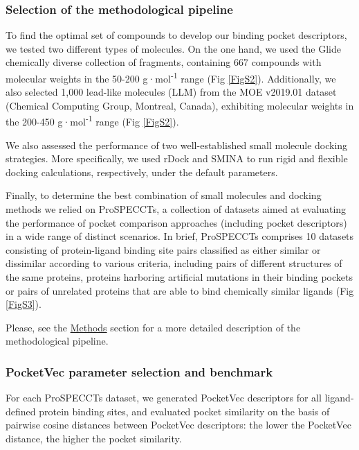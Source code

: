 \subsubsection{Selection of the methodological pipeline}

To find the optimal set of compounds to develop our binding pocket descriptors, we tested two different types of molecules. On the one hand, we used the Glide chemically diverse collection of fragments\cite{friesner_glide_2004, halgren_glide_2004}, containing 667 compounds with molecular weights in the 50-200 g·mol\textsuperscript{-1} range (Fig \ref{FigS2}). Additionally, we also selected 1,000 lead-like molecules (LLM) from the MOE v2019.01 dataset (Chemical Computing Group, Montreal, Canada), exhibiting molecular weights in the 200-450 g·mol\textsuperscript{-1} range (Fig \ref{FigS2}).

We also assessed the performance of two well-established small molecule docking strategies. More specifically, we used rDock\cite{ruiz-carmona_rdock_2014} and SMINA\cite{koes_lessons_2013} to run rigid and flexible docking calculations, respectively, under the default parameters.

Finally, to determine the best combination of small molecules and docking methods we relied on ProSPECCTs, a collection of datasets aimed at evaluating the performance of pocket comparison approaches (including pocket descriptors) in a wide range of distinct scenarios\cite{ehrt_benchmark_2018}. In brief, ProSPECCTs comprises 10 datasets consisting of protein-ligand binding site pairs classified as either similar or dissimilar according to various criteria, including pairs of different structures of the same proteins, proteins harboring artificial mutations in their binding pockets or pairs of unrelated proteins that are able to bind chemically similar ligands (Fig \ref{FigS3}).

Please, see the \hyperref[PocketVec_Methods]{Methods} section for a more detailed description of the methodological pipeline.


\subsubsection{PocketVec parameter selection and benchmark}

For each ProSPECCTs dataset, we generated PocketVec descriptors for all ligand-defined protein binding sites, and evaluated pocket similarity on the basis of pairwise cosine distances between PocketVec descriptors: the lower the PocketVec distance, the higher the pocket similarity. 